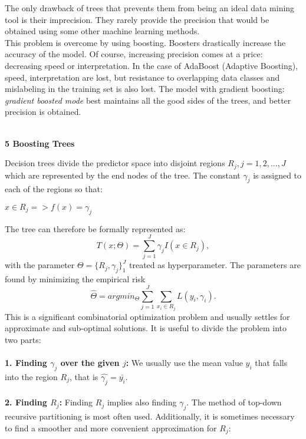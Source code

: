 \documentclass[12pt, letterpaper, twoside]{article}
\begin{document}
\hspace*{4ex}The only drawback of trees that prevents them from being an ideal data mining tool is their imprecision. They rarely provide the precision that would be obtained using some other machine learning methods.\\
\hspace*{4ex}This problem is overcome by using boosting. Boosters drastically increase the accuracy of the model. Of course, increasing precision comes at a price: decreasing speed or interpretation. In the case of AdaBoost (Adaptive Boosting), speed, interpretation are lost, but resistance to overlapping data classes and mislabeling in the training set is also lost. The model with gradient boosting: \emph{gradient boosted mode} best maintains all the good sides of the trees, and better precision is obtained.
\begin{center}
\textbf{\large{\\5 Boosting Trees}\\}
\end{center}
\hspace*{4ex}Decision trees divide the predictor space into disjoint regions $R_j , j = 1, 2, ..., J$ which are represented by the end nodes of the tree. The constant $\gamma_j$ is assigned to each of the regions so that:
\begin{center}
$x\in R_j => f(x)=\gamma_j$
\end{center}
The tree can therefore be formally represented as:
\begin{equation*}
T(x;\Theta)=\sum_{j=1}^J\gamma_jI(x \in R_j),
\end{equation*}
with the parameter $\Theta=\{R_j,\gamma_j\}_1^J$ treated as hyperparameter. The parameters are found by minimizing the empirical risk
\begin{equation*}
\hat{\Theta}=argmin_{\Theta}\sum_{j=1}^J\sum_{x_i \in R_j}L(y_i,\gamma_i).
\end{equation*}
This is a significant combinatorial optimization problem and usually settles for approximate and sub-optimal solutions. It is useful to divide the problem into two parts:\\
\textbf{\\1. Finding $\gamma_j$ over the given $j$:} We usually use the mean value $y_i$ that falls into the region $R_j$, that is $\hat{\gamma_j}=\bar{y_i}$.\\
\textbf{\\2. Finding $R_j$:} Finding $R_j$ implies also finding $\gamma_j$. The method of top-down recursive partitioning is most often used. Additionally, it is sometimes necessary to find a smoother and more convenient approximation for $R_j$: 
\end{document}
